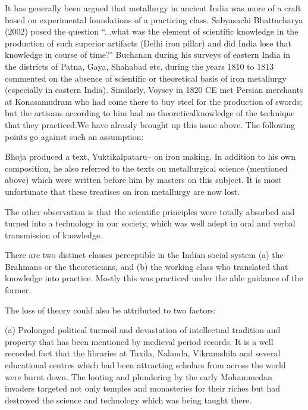 It has generally been argued that metallurgy in ancient India was more of a craft based on experimental foundations of a practicing class. Sabyasachi Bhattacharya (2002) posed the question ``...what was the element of scientific knowledge in the production of such superior artifacts (Delhi iron pillar) and did India lose that knowledge in course of time?" Buchanan during his surveys of eastern India in the districts of Patna, Gaya, Shahabad etc. during the years 1810 to 1813 commented on the absence of scientific or theoretical basis of iron metallurgy (especially in eastern India). Similarly, Voysey in 1820 CE met Persian merchants at Konasamudram who had come there to buy steel for the production of swords; but the artisans according to him had no theoreticalknowledge of the technique that they practiced.We have already brought up this issue above. The following points go against such an assumption:

\item Bhoja produced a text, Yuktikalpataru– on iron making. In addition to his own composition, he also referred to the texts on metallurgical science (mentioned above) which were written before him by masters on this subject. It is most unfortunate that these treatises on iron metallurgy are now lost.

 \item The other observation is that the scientific principles were totally absorbed and turned into a technology in our society, which was well adept in oral and verbal transmission of knowledge.

 \item There are two distinct classes perceptible in the Indian social system (a) the Brahmans or the theoreticians, and (b) the working class who translated that knowledge into practice. Mostly this was practiced under the able guidance of the former.

 \item The loss of theory could also be attributed to two factors:

 (a) Prolonged political turmoil and devastation of intellectual tradition and property that has been mentioned by medieval period records. It is a well recorded fact that the libraries at Taxila, Nalanda, Vikramshila and several educational centres which had been attracting scholars from across the world were burnt down. The looting and plundering by the early Mohammedan invaders targeted not only temples and monasteries for their riches but had destroyed the science and technology which was being taught there.

